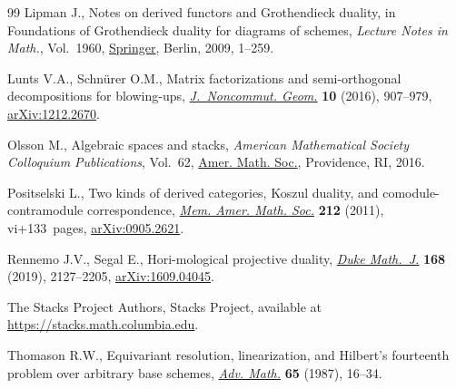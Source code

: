 \documentclass[11pt]{article}
\numberwithin{equation}{section}
\numberwithin{equation}{section}
\begin{document}
\begin{thebibliography}{99}
Lipman J., Notes on derived functors and {G}rothendieck duality, in Foundations
 of {G}rothendieck duality for diagrams of schemes, \textit{Lecture Notes in
 Math.}, Vol.~1960, \href{https://doi.org/10.1007/978-3-540-85420-3}{Springer}, Berlin, 2009, 1--259.

Lunts V.A., Schn\"urer O.M., Matrix factorizations and semi-orthogonal
 decompositions for blowing-ups, \href{https://doi.org/10.4171/JNCG/252}{\textit{J.~Noncommut. Geom.}} \textbf{10}
 (2016), 907--979, \href{https://arxiv.org/abs/1212.2670}{arXiv:1212.2670}.

Olsson M., Algebraic spaces and stacks, \textit{American Mathematical Society
 Colloquium Publications}, Vol.~62, \href{https://doi.org/10.1090/coll/062}{Amer. Math. Soc.}, Providence, RI, 2016.

Positselski L., Two kinds of derived categories, {K}oszul duality, and
 comodule-contramodule correspondence, \href{https://doi.org/10.1090/S0065-9266-2010-00631-8}{\textit{Mem. Amer. Math. Soc.}}
 \textbf{212} (2011), vi+133~pages, \href{https://arxiv.org/abs/0905.2621}{arXiv:0905.2621}.

Rennemo J.V., Segal E., Hori-mological projective duality, \href{https://doi.org/10.1215/00127094-2019-0014}{\textit{Duke
 Math.~J.}} \textbf{168} (2019), 2127--2205, \href{https://arxiv.org/abs/1609.04045}{arXiv:1609.04045}.

The Stacks Project Authors, Stacks Project, available at \url{https://stacks.math.columbia.edu}.

Thomason R.W., Equivariant resolution, linearization, and {H}ilbert's
 fourteenth problem over arbitrary base schemes, \href{https://doi.org/10.1016/0001-8708(87)90016-8}{\textit{Adv. Math.}}
 \textbf{65} (1987), 16--34.

\end{thebibliography}
\end{document}

